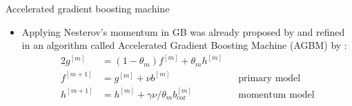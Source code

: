 \documentclass[t,10pt]{beamer}
\begin{document}
%
%
%
%
%
%

\begin{frame}{Accelerated gradient boosting machine}
  \begin{itemize}
    \item
      Applying Nesterov's momentum in GB was already proposed by \cite{biau2019accelerated} and refined in an algorithm called Accelerated Gradient Boosting Machine (AGBM) by \cite{lu2020accelerating}:
      \begin{alignat*}{2}
      g^{[m]} &= (1 - \theta_m) f^{[m]} + \theta_m h^{[m]}             &&\\
      f^{[m+1]} &= g^{[m]} + \nu b^{[m]}                               &&\text{primary model}\\
      h^{[m+1]} &= h^{[m]} + \gamma\nu / \theta_m b^{[m]}_{\text{cor}} &&\text{momentum model}
      \end{alignat*}
  \end{itemize}
\end{frame}
\end{document}
